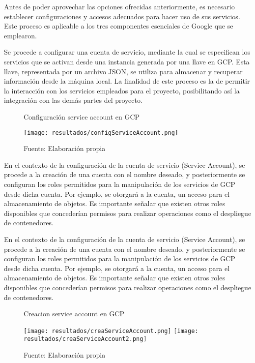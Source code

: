 Antes de poder aprovechar las opciones ofrecidas anteriormente, es necesario establecer configuraciones y accesos adecuados para hacer uso de sus servicios. Este proceso es aplicable a los tres componentes esenciales de Google que se emplearon. \newline 

Se procede a configurar una cuenta de servicio, mediante la cual se especifican los servicios que se activan desde una instancia generada por una llave en GCP. Esta llave, representada por un archivo JSON, se utiliza para almacenar y recuperar información desde la máquina local. La finalidad de este proceso es la de permitir la interacción con los servicios empleados para el proyecto, posibilitando así la integración con las demás partes del proyecto.

\begin{figure}[h]
	\centering
	\caption{Configuración service account en GCP}
	\texttt{[image: resultados/configServiceAccount.png]}
	\caption*{\footnotesize Fuente: Elaboración propia}
	\label{fig:figuraConfigServiceAccount}
\end{figure}

\newpage

En el contexto de la configuración de la cuenta de servicio (Service Account), se procede a la creación de una cuenta con el nombre deseado, y posteriormente se configuran los roles permitidos para la manipulación de los servicios de GCP desde dicha cuenta. Por ejemplo, se otorgará a la cuenta, un acceso para el almacenamiento de objetos. Es importante señalar que existen otros roles disponibles que concederían permisos para realizar operaciones como el despliegue de contenedores. \newline

En el contexto de la configuración de la cuenta de servicio (Service Account), se procede a la creación de una cuenta con el nombre deseado, y posteriormente se configuran los roles permitidos para la manipulación de los servicios de GCP desde dicha cuenta. Por ejemplo, se otorgará a la cuenta, un acceso para el almacenamiento de objetos. Es importante señalar que existen otros roles disponibles que concederían permisos para realizar operaciones como el despliegue de contenedores.

\newpage

\begin{figure}[h]
	\centering
	\caption{Creacion service account en GCP}
	\texttt{[image: resultados/creaServiceAccount.png]}
	\texttt{[image: resultados/creaServiceAccount2.png]}
	\caption*{\footnotesize Fuente: Elaboración propia}
	\label{fig:figuraCreaServiceAccount}
\end{figure}

